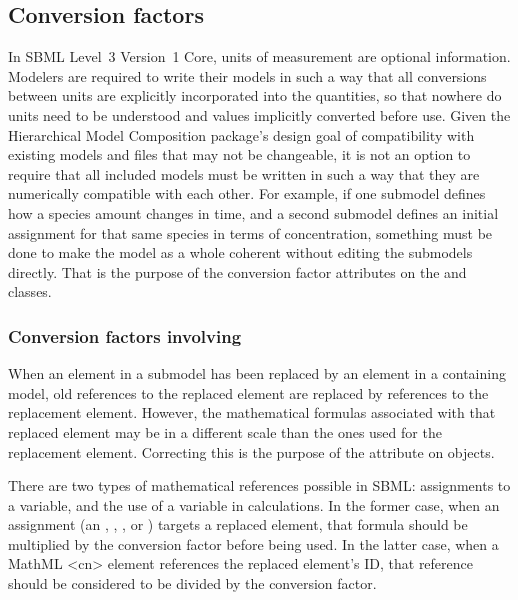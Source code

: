 \subsection{Conversion factors}
\label{conversion-factors}

In SBML Level~3 Version~1 Core, units of measurement are optional
information.  Modelers are required to write their models in such a way
that all conversions between units are explicitly incorporated into the
quantities, so that nowhere do units need to be understood and values
implicitly converted before use.  Given the Hierarchical Model
Composition package's design goal of compatibility with existing models
and files that may not be changeable, it is not an option to require
that all included models must be written in such a way that they are
numerically compatible with each other.  For example, if one submodel
defines how a species amount changes in time, and a second submodel
defines an initial assignment for that same species in terms of
concentration, something must be done to make the model as a whole
coherent without editing the submodels directly.  That is the purpose of
the conversion factor attributes on the \ReplacedElement and \Submodel
classes.


\subsubsection{Conversion factors involving }

When an element in a submodel has been replaced by an element in a
containing model, old references to the replaced element are replaced by
references to the replacement element.  However, the mathematical
formulas associated with that replaced element may be in a different
scale than the ones used for the replacement element.  Correcting this is the purpose
of the  attribute on \ReplacedElement objects.

There are two types of mathematical references possible in SBML:  assignments
to a variable, and the use of a variable in calculations.  In the former
case, when an assignment (an \InitialAssignment, \EventAssignment, \AssignmentRule,
or \RateRule) targets a replaced element, that formula should be 
multiplied by the conversion factor before being used.  In the latter
case, when a MathML <cn> element references the replaced element's ID, that
reference should be considered to be divided by the conversion factor.

